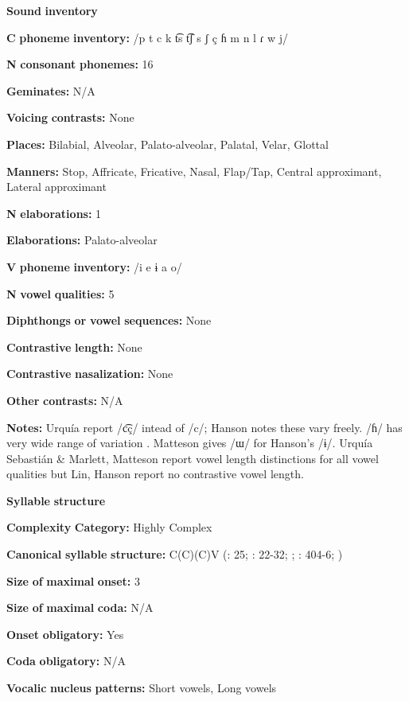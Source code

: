 \textbf{Sound} \textbf{inventory}

\textbf{C} \textbf{phoneme} \textbf{inventory:} /p t c k t͡s t͡ʃ s ʃ ç ɦ m n l ɾ w j/

\textbf{N} \textbf{consonant} \textbf{phonemes:} 16

\textbf{Geminates:} N/A

\textbf{Voicing} \textbf{contrasts:} None

\textbf{Places:} Bilabial, Alveolar, Palato-alveolar, Palatal, Velar, Glottal

\textbf{Manners:} Stop, Affricate, Fricative, Nasal, Flap/Tap, Central approximant, Lateral approximant

\textbf{N} \textbf{elaborations:} 1

\textbf{Elaborations:} Palato-alveolar

\textbf{V} \textbf{phoneme} \textbf{inventory:} /i e ɨ a o/

\textbf{N} \textbf{vowel} \textbf{qualities:} 5

\textbf{Diphthongs} \textbf{or} \textbf{vowel} \textbf{sequences:} None

\textbf{Contrastive} \textbf{length:} None

\textbf{Contrastive} \textbf{nasalization:} None

\textbf{Other} \textbf{contrasts:} N/A

\textbf{Notes:} Urquía \citet{SebastiánMarlett2008} report /c͡ç/ intead of /c/; Hanson notes these vary freely. /ɦ/ has very wide range of variation \citep[20-23]{Hanson2010}. Matteson gives /ɯ/ for Hanson’s /ɨ/. Urquía Sebastián \& Marlett, Matteson report vowel length distinctions for all vowel qualities but Lin, Hanson report no contrastive vowel length.

\textbf{Syllable} \textbf{structure}

\textbf{Complexity} \textbf{Category:} Highly Complex

\textbf{Canonical} \textbf{syllable} \textbf{structure:} C(C)(C)V (\citealt{Hanson2010}: 25; \citealt{Matteson1965}: 22-32; \citealt{MattesonPike1958}; \citealt{Lin1997}: 404-6; \citealt{Lin1993})

\textbf{Size} \textbf{of} \textbf{maximal} \textbf{onset:} 3

\textbf{Size} \textbf{of} \textbf{maximal} \textbf{coda:} N/A

\textbf{Onset} \textbf{obligatory:} Yes

\textbf{Coda} \textbf{obligatory:} N/A

\textbf{Vocalic} \textbf{nucleus} \textbf{patterns:} Short vowels, Long vowels

